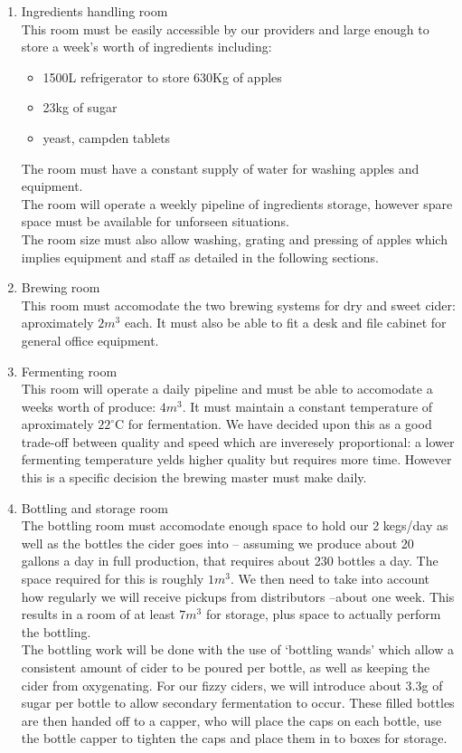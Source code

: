 \documentclass[11pt]{article}
\begin{document}
  \begin{enumerate}
  \item Ingredients handling room \\
  This room must be easily accessible by our providers and large enough to store a week's worth of ingredients including:
    \begin{itemize}
    \item 1500L refrigerator to store 630Kg of apples
    \item 23kg of sugar
    \item yeast, campden tablets
    \end{itemize}
  The room must have a constant supply of water for washing apples and equipment. \\
  The room will operate a weekly pipeline of ingredients storage, however spare space must be available for unforseen situations.\\
  The room size must also allow washing, grating and pressing of apples which implies equipment and staff as detailed in the following sections.

  \item Brewing room \\
  This room must accomodate the two brewing systems for dry and sweet cider: aproximately $2m^3$ each. It must also be able to fit a desk and file cabinet for general office equipment.
  \item Fermenting room \\
  This room will operate a daily pipeline and must be able to accomodate a weeks worth of produce: $4m^3$. It must maintain a constant temperature of aproximately $22^\circ$C for fermentation. We have decided upon this as a good trade-off between quality and speed which are inveresely proportional: a lower fermenting temperature yelds higher quality but requires more time. However this is a specific decision the brewing master must make daily.

  \item Bottling and storage room \\
  The bottling room must accomodate enough space to hold our 2 kegs/day as well as the bottles the cider goes into -- assuming we produce about 20 gallons a day in full production, that requires about 230 bottles a day. The space required for this is roughly $1m^3$. We then need to take into account how regularly we will receive pickups from distributors --about one week. This results in a room of at least $7m^3$ for storage, plus space to actually perform the bottling. \\
The bottling work will be done with the use of `bottling wands' which allow a consistent amount of cider to be poured per bottle, as well as keeping the cider from oxygenating. For our fizzy ciders, we will introduce about 3.3g of sugar per bottle to allow secondary fermentation to occur. These filled bottles are then handed off to a capper, who will place the caps on each bottle, use the bottle capper to tighten the caps and place them in to boxes for storage.


\end{enumerate}
\end{document}
